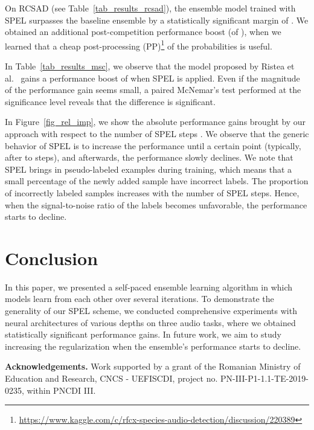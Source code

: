 \documentclass[a4paper]{article}
\begin{document}
On RCSAD (see Table~\ref{tab_results_rcsad}), the ensemble model trained with SPEL surpasses the baseline ensemble by a statistically significant margin of . We obtained an additional post-competition performance boost (of ), when we learned that a cheap post-processing (PP)\footnote{\url{https://www.kaggle.com/c/rfcx-species-audio-detection/discussion/220389}} of the probabilities is useful.

In Table~\ref{tab_results_msc}, we observe that the model proposed by Ristea et al.~\cite{ristea2020you} gains a performance boost of  when SPEL is applied. Even if the magnitude of the performance gain seems small, a paired McNemar's test \cite{Dietterich-NC-1998} performed at the significance level  reveals that the difference is significant.

In Figure~\ref{fig_rel_imp}, we show the absolute performance gains brought by our approach with respect to the number of SPEL steps . We observe that the generic behavior of SPEL is to increase the performance until a certain point (typically, after  to  steps), and afterwards, the performance slowly declines. We note that SPEL brings in pseudo-labeled examples during training, which means that a small percentage of the newly added sample have incorrect labels. The proportion of incorrectly labeled samples increases with the number of SPEL steps. Hence, when the signal-to-noise ratio of the labels becomes unfavorable, the performance starts to decline. 

\section{Conclusion}

In this paper, we presented a self-paced ensemble learning algorithm in which models learn from each other over several iterations. To demonstrate the generality of our SPEL scheme, we conducted comprehensive experiments with neural architectures of various depths on three audio tasks, where we obtained statistically significant performance gains. In future work, we aim to study increasing the regularization when the ensemble's performance starts to decline.

\noindent
{\bf Acknowledgements.} Work supported by a grant of the Romanian Ministry of Education and Research, CNCS - UEFISCDI, project no. PN-III-P1-1.1-TE-2019-0235, within PNCDI III.




\end{document}
